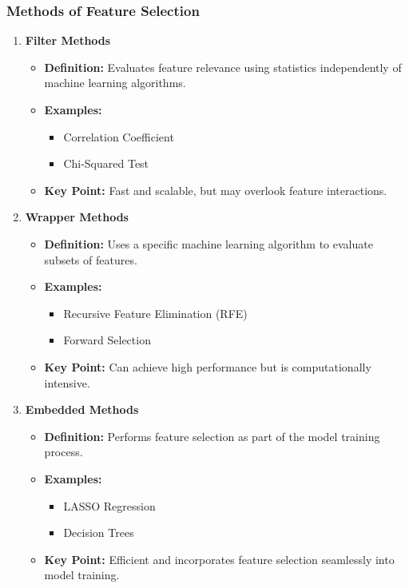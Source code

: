 \documentclass[aspectratio=169]{beamer}
\begin{document}
\begin{frame}[fragile]
    \frametitle{Methods of Feature Selection}
    \begin{enumerate}
        \item \textbf{Filter Methods}
        \begin{itemize}
            \item \textbf{Definition:} Evaluates feature relevance using statistics independently of machine learning algorithms.
            \item \textbf{Examples:}
                \begin{itemize}
                    \item Correlation Coefficient
                    \item Chi-Squared Test
                \end{itemize}
            \item \textbf{Key Point:} Fast and scalable, but may overlook feature interactions.
        \end{itemize}
        
        \item \textbf{Wrapper Methods}
        \begin{itemize}
            \item \textbf{Definition:} Uses a specific machine learning algorithm to evaluate subsets of features.
            \item \textbf{Examples:}
                \begin{itemize}
                    \item Recursive Feature Elimination (RFE)
                    \item Forward Selection
                \end{itemize}
            \item \textbf{Key Point:} Can achieve high performance but is computationally intensive.
        \end{itemize}

        \item \textbf{Embedded Methods}
        \begin{itemize}
            \item \textbf{Definition:} Performs feature selection as part of the model training process.
            \item \textbf{Examples:}
                \begin{itemize}
                    \item LASSO Regression
                    \item Decision Trees
                \end{itemize}
            \item \textbf{Key Point:} Efficient and incorporates feature selection seamlessly into model training.
        \end{itemize}
    \end{enumerate}
\end{frame}
\end{document}
